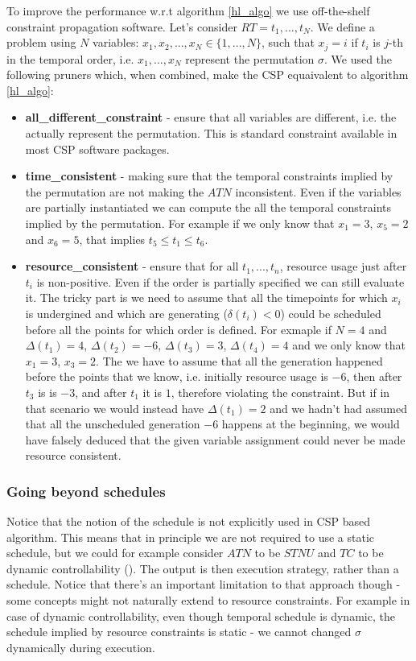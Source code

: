 \documentclass{article}
\begin{document}
\begin{multicols}{2}
To improve the performance w.r.t algorithm \ref{hl_algo} we use off-the-shelf constraint propagation software. Let's consider $RT={t_1, ..., t_N}$. We define a problem using $N$ variables:  $x_1, x_2, ..., x_N \in \{ 1, ..., N \}$, such that $x_j=i$ if $t_i$ is $j$-th in the temporal order, i.e. $x_1, ..., x_N$ represent the permutation $\sigma$. We used the following pruners which, when combined, make the CSP equaivalent to algorithm \ref{hl_algo}:
\begin{itemize}
\item \textbf{all\_different\_constraint} - ensure that all variables are different, i.e. the actually represent the permutation. This is standard constraint available in most CSP software packages.
\item \textbf{time\_consistent} - making sure that the temporal constraints implied by the permutation are not making the $ATN$ inconsistent. Even if the variables are partially instantiated we can compute the all the temporal constraints implied by the permutation. For example if we only know that $x_1 = 3$, $x_5 = 2$ and $x_6=5$, that implies $t_5 \leq t_1 \leq t_6$.
\item \textbf{resource\_consistent} - ensure that for all $t_1, ..., t_n$, resource usage just after $t_i$ is non-positive. Even if the order is partially specified we can still evaluate it. The tricky part is we need to assume that all the timepoints for which $x_i$ is undergined and which are generating ($\delta(t_i) < 0$) could be scheduled before all the points for which order is defined. For exmaple if $N = 4$ and $\Delta(t_1) = 4$, $\Delta(t_2) = -6$, $\Delta(t_3) = 3$, $\Delta(t_4) = 4$ and we only know that $x_1 = 3$, $x_3 = 2$. The we have to assume that all the generation happened before the points that we know, i.e. initially resource usage is $-6$, then after $t_3$ is is $-3$, and after $t_1$ it is $1$, therefore violating the constraint. But if in that scenario we would instead have $\Delta(t_1) = 2$ and we hadn't had assumed that all the unscheduled generation $-6$ happens at the beginning, we would have falsely deduced that the given variable assignment could never be made resource consistent.
\end{itemize}

\subsubsection{Going beyond schedules}
Notice that the notion of the schedule is not explicitly used in CSP based algorithm. This means that in principle we are not required to use a static schedule, but we could for example consider $ATN$ to be $STNU$ and $TC$ to be dynamic controllability (\cite{vidal1996dealing}). The output is then execution strategy, rather than a schedule. Notice that there's an important limitation to that approach though - some concepts might not naturally extend to resource constraints. For example in case of dynamic controllability, even though temporal schedule is dynamic, the schedule implied by resource constraints is static - we cannot changed $\sigma$ dynamically during execution.


\end{multicols}
\end{document}
